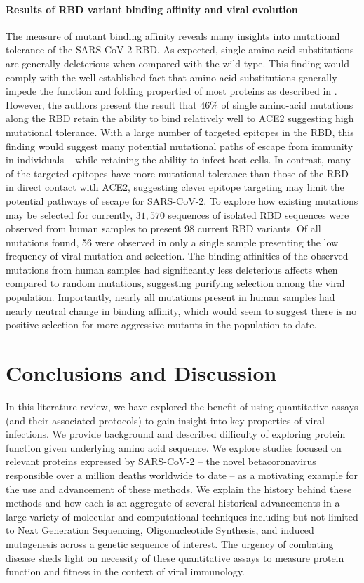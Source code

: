 \documentclass{article}
\begin{document}
\paragraph{Results of RBD variant binding affinity and viral evolution}
The measure of mutant binding affinity reveals many insights into mutational tolerance of the SARS-CoV-2 RBD.
As expected, single amino acid substitutions are generally deleterious when compared with the wild type.
This finding would comply with the well-established fact that amino acid substitutions generally impede the function and folding propertied of most proteins as described in \citet{Soskine2010}.
However, the authors present the result that $46\%$ of single amino-acid mutations along the RBD retain the ability to bind relatively well to ACE2 suggesting high mutational tolerance.
With a large number of targeted epitopes in the RBD, this finding would suggest many potential mutational paths of escape from immunity in individuals -- while retaining the ability to infect host cells.
In contrast, many of the targeted epitopes have more mutational tolerance than those of the RBD in direct contact with ACE2, suggesting clever epitope targeting may limit the potential pathways of escape for SARS-CoV-2.
To explore how existing mutations may be selected for currently, $31,570$ sequences of isolated RBD sequences were observed from human samples to present 98 current RBD variants.
Of all mutations found, 56 were observed in only a single sample presenting the low frequency of viral mutation and selection.
The binding affinities of the observed mutations from human samples had significantly less deleterious affects when compared to random mutations, suggesting purifying selection among the viral population.
Importantly, nearly all mutations present in human samples had nearly neutral change in binding affinity, which would seem to suggest there is no positive selection for more aggressive mutants in the population to date.

\section*{Conclusions and Discussion}

In this literature review, we have explored the benefit of using quantitative assays (and their associated protocols) to gain insight into key properties of viral infections.
We provide background and described difficulty of exploring protein function given underlying amino acid sequence.
We explore studies focused on relevant proteins expressed by SARS-CoV-2 -- the novel betacoronavirus responsible over a million deaths worldwide to date -- as a motivating example for the use and advancement of these methods.
We explain the history behind these methods and how each is an aggregate of several historical advancements in a large variety of molecular and computational techniques including but not limited to Next Generation Sequencing, Oligonucleotide Synthesis, and induced mutagenesis across a genetic sequence of interest.
The urgency of combating disease sheds light on necessity of these quantitative assays to measure protein function and fitness in the context of viral immunology.
\end{document}
